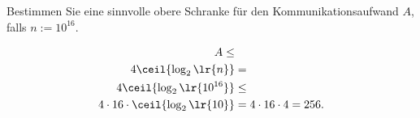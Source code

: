 \begin{myexercise}
	Bestimmen Sie eine sinnvolle obere Schranke für den Kommunikationsaufwand $A$, falls $n:=10^{16}$.
	\begin{myanswer}
		\begin{align*}
			A \leq                             &                           \\
			4\ceil{\log_2\lr{n}}               & =                         \\
			4\ceil{\log_2\lr{10^{16}}}         & \leq                      \\
			4\cdot 16\cdot\ceil{\log_2\lr{10}} & = 4\cdot 16\cdot 4 = 256.
		\end{align*}
	\end{myanswer}
\end{myexercise}

